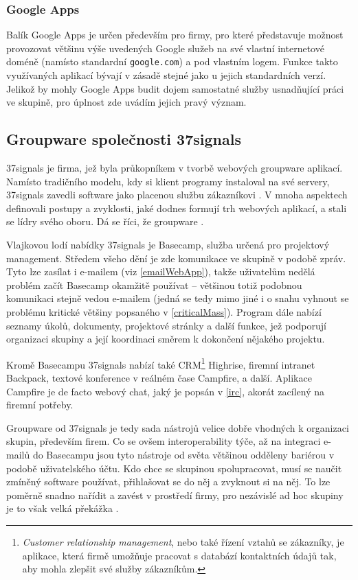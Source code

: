 \documentclass[12pt,oneside,final]{fithesis2}
\begin{document}
\subsubsection*{Google Apps}
Balík Google Apps je určen především pro firmy, pro které představuje možnost provozovat většinu výše uvedených Google služeb na své vlastní internetové doméně (namísto standardní {\tt google.com}) a pod vlastním logem. Funkce takto využívaných aplikací bývají v zásadě stejné jako u jejich standardních verzí. Jelikož by mohly Google Apps budit dojem samostatné služby usnadňující práci ve skupině, pro úplnost zde uvádím jejich pravý význam.

\subsection{Groupware společnosti 37signals}\label{37signals}
37signals je firma, jež byla průkopníkem v tvorbě webových groupware aplikací. Namísto tradičního modelu, kdy si klient programy instaloval na své servery, 37signals zavedli software jako placenou službu zákazníkovi \cite{37signals2008getting}. V mnoha aspektech definovali postupy a zvyklosti, jaké dodnes formují trh webových aplikací, a stali se lídry svého oboru. Dá se říci, že groupware .

Vlajkovou lodí nabídky 37signals je Basecamp, služba určená pro projektový management. Středem všeho dění je zde komunikace ve skupině v podobě zpráv. Tyto lze zasílat i e-mailem (viz \ref{emailWebApp}), takže uživatelům nedělá problém začít Basecamp okamžitě používat -- většinou totiž podobnou komunikaci stejně vedou e-mailem (jedná se tedy mimo jiné i o snahu vyhnout se problému kritické většiny popsaného v \ref{criticalMass}). Program dále nabízí seznamy úkolů, dokumenty, projektové stránky a další funkce, jež podporují organizaci skupiny a její koordinaci směrem k dokončení nějakého projektu.

Kromě Basecampu 37signals nabízí také CRM\footnote{{\it Customer relationship management}, nebo také řízení vztahů se zákazníky, je aplikace, která firmě umožňuje pracovat s databází kontaktních údajů tak, aby mohla zlepšit své služby zákazníkům.} Highrise, firemní intranet Backpack, textové konference v reálném čase Campfire, a další. Aplikace Campfire je de facto webový chat, jaký je popsán v \ref{irc}, akorát zacílený na firemní potřeby.

Groupware od 37signals je tedy sada nástrojů velice dobře vhodných k organizaci skupin, především firem. Co se ovšem interoperability týče, až na integraci e-mailů do Basecampu jsou tyto nástroje od světa většinou odděleny bariérou v podobě uživatelského účtu. Kdo chce se skupinou spolupracovat, musí se naučit zmíněný software používat, přihlašovat se do něj a zvyknout si na něj. To lze poměrně snadno nařídit a zavést v prostředí firmy, pro nezávislé ad hoc skupiny je to však velká překážka \cite{grudin1994groupware}.
\end{document}
